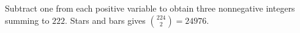 Subtract one from each positive variable to obtain three nonnegative integers summing to $222$. Stars and bars gives $\binom{224}2=\boxed{24976}$.
